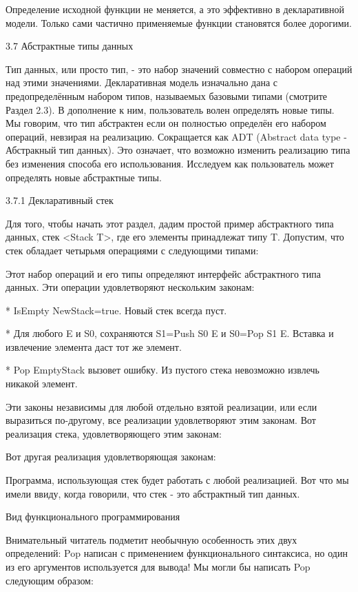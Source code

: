 Определение исходной функции не меняется, а это эффективно в декларативной модели. Только сами частично применяемые функции становятся более дорогими.

3.7 Абстрактные типы данных

Тип данных, или просто тип, - это набор значений совместно с набором операций над этими значениями. Декларативная модель изначально дана с предопределённым набором типов, называемых базовыми типами (смотрите Раздел 2.3). В дополнение к ним, пользователь волен определять новые типы. Мы говорим, что тип абстрактен если он полностью определён его набором операций, невзирая на реализацию. Сокращается как ADT (Abstract data type - Абстракный тип данных). Это означает, что возможно изменить реализацию типа без изменения способа его использования. Исследуем как пользователь может определять новые абстрактные типы.

3.7.1 Декларативный стек

Для того, чтобы начать этот раздел, дадим простой пример абстрактного типа данных, стек <Stack T>, где его элементы принадлежат типу T. Допустим, что стек обладает четырьмя операциями с следующими типами:

Этот набор операций и его типы определяют интерфейс абстрактного типа данных. Эти операции удовлетворяют нескольким законам:

* {IsEmpty {NewStack}}=true. Новый стек всегда пуст.

* Для любого E и S0, сохраняются S1={Push S0 E} и S0={Pop S1 E}. Вставка и извлечение элемента даст тот же элемент.

* {Pop {EmptyStack}} вызовет ошибку. Из пустого стека невозможно извлечь никакой элемент.

Эти законы независимы для любой отдельно взятой реализации, или если выразиться по-другому, все реализации удовлетворяют этим законам. Вот реализация стека, удовлетворяющего этим законам:

Вот другая реализация удовлетворяющая законам:

Программа, использующая стек будет работать с любой реализацией. Вот что мы имели ввиду, когда говорили, что стек - это абстрактный тип данных.

Вид функционального программирования

Внимательный читатель подметит необычную особенность этих двух определений: Pop написан с применением функционального синтаксиса, но один из его аргументов используется для вывода! Мы могли бы написать Pop следующим образом:

